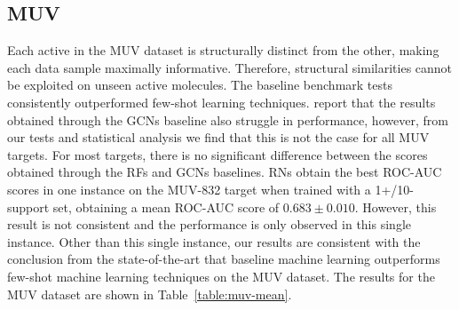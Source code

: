\subsection{MUV}

Each active in the MUV dataset is structurally distinct from the other, making each data sample maximally informative. Therefore, structural similarities cannot be exploited on unseen active molecules. The baseline benchmark tests consistently outperformed few-shot learning techniques. \citet{altae2017low} report that the results obtained through the GCNs baseline also struggle in performance, however, from our tests and statistical analysis we find that this is not the case for all MUV targets. For most targets, there is no significant difference between the scores obtained through the RFs and GCNs baselines. RNs obtain the best ROC-AUC scores in one instance on the MUV-832 target when trained with a 1+/10- support set, obtaining a mean ROC-AUC score of $0.683 \pm 0.010$. However, this result is not consistent and the performance is only observed in this single instance. Other than this single instance, our results are consistent with the conclusion from the state-of-the-art that baseline machine learning outperforms few-shot machine learning techniques on the MUV dataset. The results for the MUV dataset are shown in Table~\ref{table:muv-mean}.

